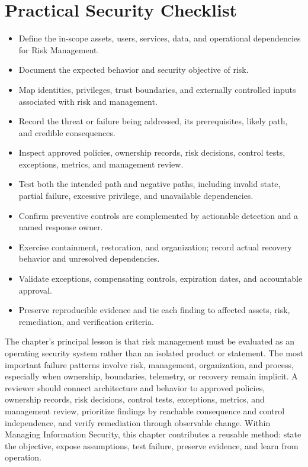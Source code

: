 \documentclass[11pt]{article}
\begin{document}
\section*{Practical Security Checklist}
\begin{itemize}[label=$\square$]
\item Define the in-scope assets, users, services, data, and operational dependencies for Risk Management.
\item Document the expected behavior and security objective of risk.
\item Map identities, privileges, trust boundaries, and externally controlled inputs associated with risk and management.
\item Record the threat or failure being addressed, its prerequisites, likely path, and credible consequences.
\item Inspect approved policies, ownership records, risk decisions, control tests, exceptions, metrics, and management review.
\item Test both the intended path and negative paths, including invalid state, partial failure, excessive privilege, and unavailable dependencies.
\item Confirm preventive controls are complemented by actionable detection and a named response owner.
\item Exercise containment, restoration, and organization; record actual recovery behavior and unresolved dependencies.
\item Validate exceptions, compensating controls, expiration dates, and accountable approval.
\item Preserve reproducible evidence and tie each finding to affected assets, risk, remediation, and verification criteria.
\end{itemize}
\begin{synthesisbox}
The chapter's principal lesson is that risk management must be evaluated as an operating security system rather than an isolated product or statement. The most important failure patterns involve risk, management, organization, and process, especially when ownership, boundaries, telemetry, or recovery remain implicit. A reviewer should connect architecture and behavior to approved policies, ownership records, risk decisions, control tests, exceptions, metrics, and management review, prioritize findings by reachable consequence and control independence, and verify remediation through observable change. Within Managing Information Security, this chapter contributes a reusable method: state the objective, expose assumptions, test failure, preserve evidence, and learn from operation.
\end{synthesisbox}
\end{document}
